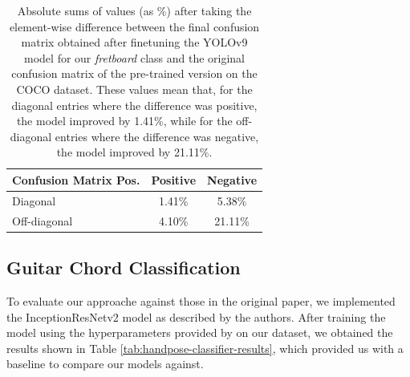 \documentclass[10pt,twocolumn,letterpaper]{article}
\begin{document}
\begin{table}[h]
    \centering
    \begin{tabular}{lcc}
        \toprule
        \textbf{Confusion Matrix Pos.} & \textbf{Positive} & \textbf{Negative} \\
        \midrule
        Diagonal                       & 1.41\%            & 5.38\%            \\
        \midrule
        Off-diagonal                   & 4.10\%            & 21.11\%           \\
        \bottomrule
    \end{tabular}
    \caption{Absolute sums of values (as \%) after taking the element-wise difference between the final confusion matrix obtained after finetuning the YOLOv9 model for our \emph{fretboard} class and the original confusion matrix of the pre-trained version on the COCO dataset. These values mean that, for the diagonal entries where the difference was positive, the model improved by 1.41\%, while for the off-diagonal entries where the difference was negative, the model improved by 21.11\%.}
    \label{tab:confusion-matrix-results}
\end{table}



\subsection{Guitar Chord Classification}
To evaluate our approache against those in the original paper, we implemented the InceptionResNetv2 model as described by the authors. After training the model using the hyperparameters provided by \cite{Kristian_Zaman_Tenoyo_Jodhinata_2024} on our dataset, we obtained the results shown in Table \ref{tab:handpose-classifier-results}, which provided us with a baseline to compare our models against.
\end{document}
